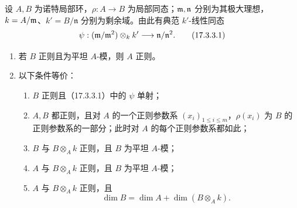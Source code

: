 设 $A,B$ 为诺特局部环，$\rho:A\to B$ 为局部同态；$\mathfrak m,\mathfrak n$ 分别为其极大理想，$k=A/\mathfrak m$、$k'=B/\mathfrak n$ 分别为剩余域。由此有典范 $k'$-线性同态
\begin{equation}
 \psi:(\mathfrak m/\mathfrak m^2)\otimes_k k'\longrightarrow\mathfrak n/\mathfrak n^2.
 \tag{17.3.3.1}
\end{equation}
\begin{enumerate}[label=(\roman*)]
 \item 若 $B$ 正则且为平坦 $A$-模，则 $A$ 正则。
 \item 以下条件等价：
 \begin{enumerate}[label=\alph*)]
  \item $B$ 正则且（17.3.3.1）中的 $\psi$ 单射；
  \item $A,B$ 都正则，且对 $A$ 的一个正则参数系 $(x_i)_{1\leq i\leq m}$，$\rho(x_i)$ 为 $B$ 的正则参数系的一部分；此时对 $A$ 的每个正则参数系都如此；
  \item $B$ 与 $B\otimes_A k$ 正则，且 $B$ 为平坦 $A$-模；
  \item $A$ 与 $B\otimes_A k$ 正则，且 $B$ 为平坦 $A$-模；
  \item $A$ 与 $B\otimes_A k$ 正则，且
  \begin{equation}
   \dim B=\dim A+\dim(B\otimes_A k).
   \tag{17.3.3.2}
  \end{equation}
 \end{enumerate}
\end{enumerate}
